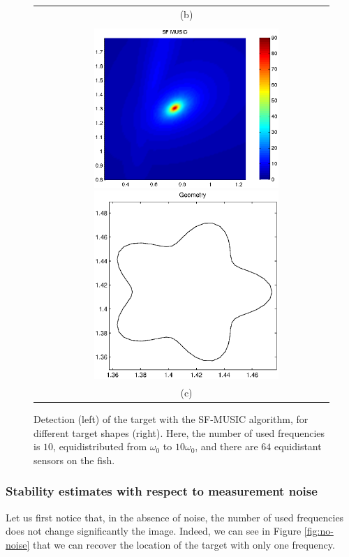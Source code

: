 \documentclass[final]{siamltex}
\numberwithin{equation}{section}
\numberwithin{figure}{section}
\numberwithin{table}{section}
\begin{document}
\begin{figure}[!h]
\begin{tabular}{lc}
& (b)\\ \tabularnewline  &
\includegraphics[width=7cm]{star.eps}
 \hspace{0.5cm} \includegraphics[width=7cm]{star_geometry.eps}\\
 & (c) \\
\end{tabular}
\caption{\label{fig:SF-MUSIC}Detection (left) of the target with
the SF-MUSIC algorithm, for different target shapes (right). Here,
the number of used frequencies is $10$, equidistributed from
$\omega_0$ to $10 \omega_0$, and there are $64$ equidistant
sensors on the fish.}
\end{figure}



\subsubsection*{Stability estimates with respect to measurement noise}

Let us first notice that, in the absence of noise, the number of
used frequencies does not change  significantly the image. Indeed,
we can see in Figure \ref{fig:no-noise} that we can recover the
location of the target  with only one frequency.
\end{document}
